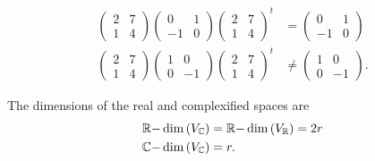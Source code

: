 \documentclass[aps,preprint]{revtex4}
\begin{document}
\begin{align}
\left( 
\begin{array}{cc}
2 & 7 \\ 
1 & 4%
\end{array}%
\right) \left( 
\begin{array}{cc}
0 & 1 \\ 
-1 & 0%
\end{array}%
\right) \left( 
\begin{array}{cc}
2 & 7 \\ 
1 & 4%
\end{array}%
\right) ^{t}& =\left( 
\begin{array}{cc}
0 & 1 \\ 
-1 & 0%
\end{array}%
\right) \\
\left( 
\begin{array}{cc}
2 & 7 \\ 
1 & 4%
\end{array}%
\right) \left( 
\begin{array}{cc}
1 & 0 \\ 
0 & -1%
\end{array}%
\right) \left( 
\begin{array}{cc}
2 & 7 \\ 
1 & 4%
\end{array}%
\right) ^{t}& \neq \left( 
\begin{array}{cc}
1 & 0 \\ 
0 & -1%
\end{array}%
\right) .
\end{align}

The dimensions of the real and complexified spaces are 
\begin{align}
\mathbb{R-}\dim \left( V_{\mathbb{C}}\right) & =\mathbb{R-}\dim \left( V_{%
\mathbb{R}}\right) =2r \\
\mathbb{C-}\dim \left( V_{\mathbb{C}}\right) & =r.
\end{align}
\end{document}
